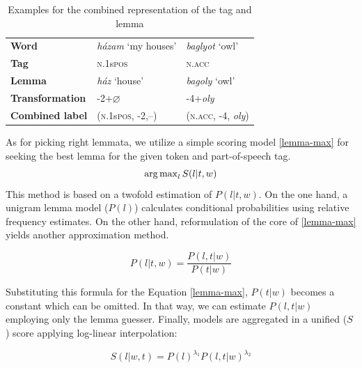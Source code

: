 \begin{table}[H]
\centering
\caption{Examples for the combined representation of the tag and lemma}
\label{tab:lemma-example}
\begin{tabular}{l | l l}
   \textbf{Word} &  \emph{házam} `my houses’ &  \emph{baglyot} `owl’ \\
   \textbf{Tag} &  \textsc{n.1}s\textsc{pos} &  \textsc{n.acc} \\
   \textbf{Lemma} &  \emph{ház} `house’ &  \emph{bagoly} `owl’ \\
   \textbf{Transformation} & -2+$\varnothing$ &  -4+\emph{oly} \\
   \textbf{Combined label} & (\textsc{n.1}s\textsc{pos}, -2,--) &  (\textsc{n.acc}, -4, \emph{oly}) \\
\end{tabular}
\end{table}


As for picking right lemmata, we utilize a simple scoring model \eqref{lemma-max} for seeking the best lemma for the given token and part-of-speech tag. 
\begin{equation}\label{lemma-max}
\operatorname{arg\,max}_l S(l|t,w)
\end{equation}
This method is based on a twofold estimation of $P(l|t,w)$. On the one hand, a unigram lemma model ($P(l)$) calculates conditional probabilities using relative frequency estimates. 
On the other hand, reformulation of the core of \eqref{lemma-max} yields another approximation method.


\begin{equation}\label{lemma-guesser}
P(l|t,w) = \frac{P(l,t|w)}{P(t|w)}
\end{equation}

Substituting this formula for the Equation \ref{lemma-max}, $P(t|w)$ becomes a constant which can be omitted. 
In that way, we can estimate $P(l,t|w)$ employing only the lemma guesser. 
Finally, models are aggregated in a unified ($S$) score applying log-linear interpolation: 


\begin{equation}\label{lemma-interpolated}
S(l|w,t) = P(l)^{\lambda_1} P(l,t|w)^{\lambda_2}
\end{equation}

